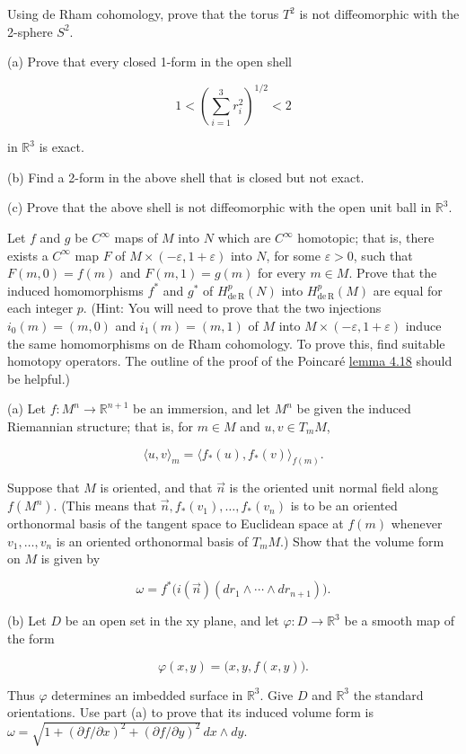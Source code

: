 \begin{problemset}
\item Using de Rham cohomology, prove that the torus $T^{2}$ is not diffeomorphic with the 2-sphere $S^{2}$.

\item (a) Prove that every closed 1-form in the open shell

\[
1<\left(\sum_{i=1}^{3}r_{i}^{2}\right)^{1/2}<2
\]

in $\mathbb{R}^{3}$ is exact.

(b) Find a 2-form in the above shell that is closed but not exact.

(c) Prove that the above shell is not diffeomorphic with the open unit ball in  $ \mathbb{R}^{3} $.

\item Let $f$ and $g$ be $C^\infty$ maps of $M$ into $N$ which are $C^\infty$ homotopic; that is, there exists a $C^\infty$ map $F$ of $M \times(-\varepsilon,1+\varepsilon)$ into $N$, for some $\varepsilon>0$, such that $F(m,0)=f(m)$ and $F(m,1)=g(m)$ for every $m\in M$. Prove that the induced homomorphisms $f^*$ and $g^*$ of $H_{\mathrm{de\,R}}^{p}(N)$ into $H_{\mathrm{de\,R}}^{p}(M)$ are equal for each integer $p$. (Hint: You will need to prove that the two injections $i_{0}(m)=(m,0)$ and $i_{1}(m)=(m,1)$ of $M$ into $M\times(-\varepsilon,1+\varepsilon)$ induce the same homomorphisms on de Rham cohomology. To prove this, find suitable homotopy operators. The outline of the proof of the Poincaré \hyperref[thm:4.18]{lemma 4.18} should be helpful.)

\item (a) Let $f: M^n \to \mathbb{R}^{n+1}$ be an immersion, and let $M^n$ be given the induced Riemannian structure; that is, for $m \in M$ and $u, v \in T_{m} M$,

\[
\langle u,v\rangle_{m}=\langle f_{*}(u),f_{*}(v)\rangle_{f(m)}.
\]

Suppose that $M$ is oriented, and that $\vec{n}$ is the oriented unit normal field along $f(M^n)$. (This means that $\vec{n}, f_{*}(v_1), \ldots, f_{*}(v_n)$ is to be an oriented orthonormal basis of the tangent space to Euclidean space at $f(m)$ whenever $v_1, \ldots, v_n$ is an oriented orthonormal basis of $T_{m} M$.) Show that the volume form on $M$ is given by

\[
\omega=f^{*}\big(i(\vec{n})(dr_{1}\wedge\cdots\wedge dr_{n+1})\big).
\]

\enlargethispage{2\baselineskip}
(b) Let $D$ be an open set in the xy plane, and let $\varphi: D \to \mathbb{R}^3$ be a smooth map of the form

\[
\varphi(x,y)=\bigl(x,y,f(x,y)\bigr).
\]

Thus $\varphi$ determines an imbedded surface in $\mathbb R^3$. Give $D$
and $\mathbb R^3$ the standard orientations. Use part (a) to prove that
its induced volume form is
$\omega=\sqrt{1+(\partial f/\partial x)^2+(\partial f/\partial y)^2}\,dx\wedge dy$.

\end{problemset}
